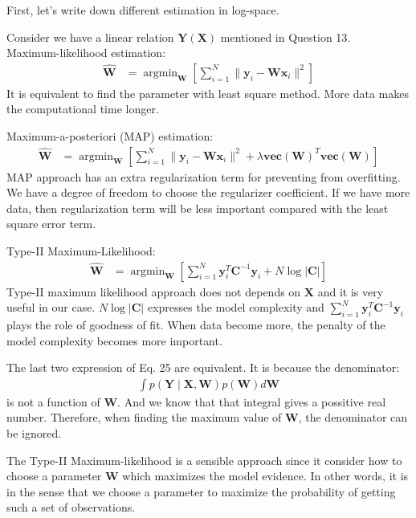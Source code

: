\documentclass[12pt]{article}
\newenvironment{question}[2][Question]{\begin{trivlist}
\kern10pt
\item[\hskip \labelsep {\bfseries #1}\hskip \labelsep {\bfseries #2.}]}{\end{trivlist}}
\begin{document}
\begin{question}{14}
First, let's write down different estimation in log-space.

Consider we have a linear relation $\mathbf{Y}(\mathbf{X})$ mentioned in Question 13.
\\ 
Maximum-likelihood estimation:
\begin{align*}
  \hat{\mathbf{W}} 
  &= \operatorname{argmin}_{\mathbf{W}}
    [\sum_{i=1}^{N} \| \mathbf{y}_i - \mathbf{W}\mathbf{x}_i\|^2]
\end{align*}
It is equivalent to find the parameter with least square method. More data makes
the computational time longer.

Maximum-a-posteriori (MAP) estimation:
\begin{align*}
  \hat{\mathbf{W}} 
  &= \operatorname{argmin}_{\mathbf{W}}
    [\sum_{i=1}^{N} \| \mathbf{y}_i - \mathbf{W}\mathbf{x}_i\|^2
      + \lambda \textbf{vec}(\textbf{W})^T\textbf{vec}(\textbf{W})]
\end{align*}
MAP approach has an extra regularization term for preventing from overfitting.
We have a degree of freedom to choose the regularizer coefficient.
If we have more data, then regularization term will be less important compared
with the least square error term.

Type-II Maximum-Likelihood:
\begin{align*}
  \hat{\mathbf{W}} 
  &= \operatorname{argmin}_{\mathbf{W}}
    [\sum_{i=1}^{N} \mathbf{y}_i^T \mathbf{C}^{-1}\mathbf{y}_i
      + N\log{|\mathbf{C}|}]
\end{align*}
Type-II maximum likelihood approach does not depends on $\mathbf{X}$ and it is
very useful in our case. $N\log{|\mathbf{C}|}$ expresses the model complexity
and $\sum_{i=1}^{N} \mathbf{y}_i^T \mathbf{C}^{-1}\mathbf{y}_i$ plays the role of
goodness of fit. When data become more, the penalty of the model complexity becomes
more important.
  
The last two expression of Eq. 25 are equivalent. It is because the denominator:
  \begin{align*}
    \int p(\mathbf{Y}\mid\mathbf{X}, \mathbf{W})p(\mathbf{W})d\mathbf{W}
  \end{align*}
is not a function of $\mathbf{W}$. And we know that that integral gives a possitive
real number. Therefore, when finding the maximum value of $\mathbf{W}$, the denominator 
can be ignored.

The Type-II Maximum-likelihood is a sensible approach since it consider how to
 choose a parameter $\mathbf{W}$ which maximizes the model evidence. In other words,
 it is in the sense that we choose a parameter to maximize the probability of 
 getting such a set of observations.
\end{question}
\end{document}
